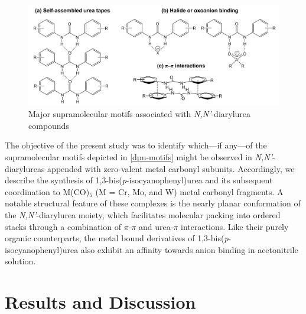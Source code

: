 \begin{figure}[h!]
    \centering
    \includegraphics[width=0.8\linewidth]{figures/pub2/dpu-motifs.png}
    \caption{Major supramolecular motifs associated with \textit{N,N'}-diarylurea compounds}\label{dpu-motifs}
\end{figure}

The objective of the present study was to identify which---if any---of the supramolecular motifs depicted in \autoref{dpu-motifs} might be observed in \textit{N,N'}-diarylureas appended with zero-valent metal carbonyl subunits. Accordingly, we describe the synthesis of 1,3-bis(\textit{p}-isocyanophenyl)urea and its subsequent coordination to M(CO)$_{5}$ (M = Cr, Mo, and W) metal carbonyl fragments. A notable structural feature of these complexes is the nearly planar conformation of the \textit{N,N'}-diarylurea moiety, which facilitates molecular packing into ordered stacks through a combination of $\pi$-$\pi$ and urea-$\pi$ interactions. Like their purely organic counterparts, the metal bound derivatives of 1,3-bis(\textit{p}-isocyanophenyl)urea also exhibit an affinity towards anion binding in acetonitrile solution.

\section{Results and Discussion}

